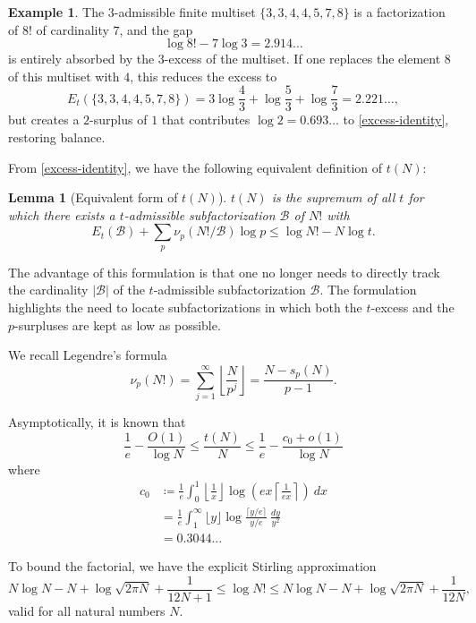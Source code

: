 \documentclass[12pt,a4paper,reqno]{amsart}
\numberwithin{equation}{section}
\theoremstyle{plain}
\newtheorem{lemma}[theorem]{Lemma}
\theoremstyle{definition}
\newtheorem{example}[theorem]{Example}
\newcommand\tuple{{\mathcal B}}
\begin{document}
\begin{example}  The $3$-admissible finite multiset $\{ 3,3,4,4,5,7,8\}$ is a factorization of $8!$ of cardinality $7$, and the gap
$$ \log 8! - 7 \log 3 = 2.914\dots$$
is entirely absorbed by the $3$-excess of the multiset.
If one replaces the element $8$ of this multiset with $4$, this reduces the excess to
$$ E_t(\{3,3,4,4,5,7,8\}) = 3 \log \frac{4}{3}  + \log \frac{5}{3} + \log \frac{7}{3} = 2.221\dots,$$
but creates a $2$-surplus of $1$ that contributes $\log 2 = 0.693\dots$ to \eqref{excess-identity}, restoring balance.
\end{example}

From \eqref{excess-identity}, we have the following equivalent definition of $t(N)$:

\begin{lemma}[Equivalent form of $t(N)$]\label{balance} $t(N)$ is the supremum of all $t$ for which there exists a $t$-admissible subfactorization $\tuple$ of $N!$ with
$$  E_t(\tuple) + \sum_p \nu_p(N!/\tuple) \log p \leq \log N! - N \log t.$$
\end{lemma}

The advantage of this formulation is that one no longer needs to directly track the cardinality $|\tuple|$ of the $t$-admissible subfactorization $\tuple$.  The formulation  highlights the need to locate subfactorizations in which both the $t$-excess and the $p$-surpluses are kept as low as possible.


We recall Legendre's formula
\begin{equation}\label{legendre}
  \nu_p(N!) = \sum_{j=1}^\infty \left\lfloor \frac{N}{p^j} \right\rfloor = \frac{N - s_p(N)}{p-1}.
\end{equation}

Asymptotically, it is known that
$$ \frac{1}{e} - \frac{O(1)}{\log N} \leq \frac{t(N)}{N} \leq \frac{1}{e} - \frac{c_0+o(1)}{\log N}$$
where
  \begin{align*}
    c_0 &\coloneqq \frac{1}{e} \int_0^1 \left \lfloor \frac{1}{x} \right\rfloor \log \left( ex \left \lceil \frac{1}{ex} \right\rceil \right)\ dx \\
    &= \frac{1}{e} \int_1^\infty \lfloor y \rfloor \log \frac{\lceil y/e \rceil}{y/e}\ \frac{dy}{y^2} \\
    &= 0.3044\dots
  \end{align*}

To bound the factorial, we have the explicit Stirling approximation \cite{robbins}
\begin{equation}\label{stirling}
  N \log N - N + \log \sqrt{2\pi N} + \frac{1}{12N+1} \leq \log N! \leq N \log N - N + \log \sqrt{2\pi N} + \frac{1}{12N},
\end{equation}
valid for all natural numbers $N$. 
\end{document}
